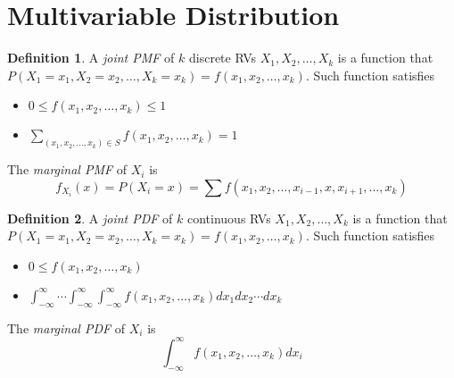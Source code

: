 \documentclass[12pt,a4paper,twoside]{article}
\theoremstyle{definition}
\newtheorem{definition}{Definition}[section]
\theoremstyle{remark}
\begin{document}
    \section{Multivariable Distribution}
    \begin{definition} 
        A \textit{joint PMF} of $k$ discrete RVs $X_1, X_2, \ldots, X_k$ is a function that $P(X_1 = x_1, X_2 = x_2, \ldots, X_k = x_k) = f(x_1, x_2, \ldots, x_k)$. 
        Such function satisfies
        \begin{itemize}
            \item $0 \leq f(x_1, x_2, \ldots, x_k) \leq 1$
            \item $\sum_{(x_1, x_2, \ldots, x_k) \in S} f(x_1, x_2, \ldots, x_k) = 1$
        \end{itemize}
        The \textit{marginal PMF} of $X_i$ is 
        \[ f_{X_i}(x) = P(X_i = x) = \sum f(x_1, x_2, \ldots, x_{i-1}, x, x_{i+1}, \ldots, x_k) \]
    \end{definition}    
    \begin{definition} 
        A \textit{joint PDF} of $k$ continuous RVs $X_1, X_2, \ldots, X_k$ is a function that $P(X_1 = x_1, X_2 = x_2, \ldots, X_k = x_k) = f(x_1, x_2, \ldots, x_k)$. 
        Such function satisfies
        \begin{itemize}
            \item $0 \leq f(x_1, x_2, \ldots, x_k)$
            \item $\displaystyle\int_{-\infty}^\infty\cdots\int_{-\infty}^\infty\int_{-\infty}^\infty f(x_1, x_2, \ldots, x_k) dx_1 dx_2 \cdots dx_k$
        \end{itemize}
        The \textit{marginal PDF} of $X_i$ is 
        \[ \int_{-\infty}^\infty f(x_1, x_2, \ldots, x_k) dx_i \]
    \end{definition}    
\end{document}
